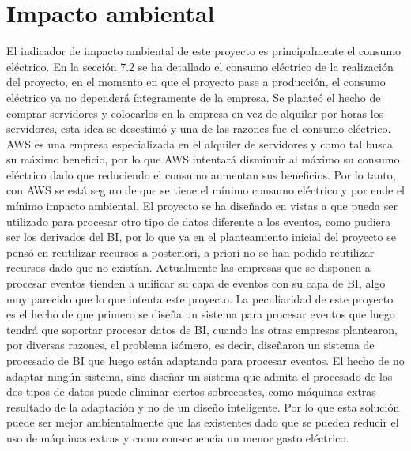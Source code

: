 \section{Impacto ambiental}
El indicador de impacto ambiental de este proyecto es principalmente el consumo eléctrico. En la sección 7.2 se ha detallado el consumo eléctrico de la realización del proyecto, en el momento en que el proyecto pase a producción, el consumo eléctrico ya no dependerá íntegramente de la empresa. Se planteó el hecho de comprar servidores y colocarlos en la empresa en vez de alquilar por horas los servidores, esta idea se desestimó y una de las razones fue el consumo eléctrico. AWS es una empresa especializada en el alquiler de servidores y como tal busca su máximo beneficio, por lo que AWS intentará disminuir al máximo su consumo eléctrico dado que reduciendo el consumo aumentan sus beneficios. Por lo tanto, con AWS se está seguro de que se tiene el mínimo consumo eléctrico y por ende el mínimo impacto ambiental.
El proyecto se ha diseñado en vistas a que pueda ser utilizado para procesar otro tipo de datos diferente a los eventos, como pudiera ser los derivados del BI, por lo que ya en el planteamiento inicial del proyecto se pensó en reutilizar recursos a posteriori, a priori no se han podido reutilizar recursos dado que no existían. 
Actualmente las empresas que se disponen a procesar eventos tienden a unificar su capa de eventos con su capa de BI, algo muy parecido que lo que intenta este proyecto. La peculiaridad de este proyecto es el hecho de que primero se diseña un sistema para procesar eventos que luego tendrá que soportar procesar datos de BI, cuando las otras empresas plantearon, por diversas razones, el problema isómero, es decir, diseñaron un sistema de procesado de BI que luego están adaptando para procesar eventos. El hecho de no adaptar ningún sistema, sino diseñar un sistema que admita el procesado de los dos tipos de datos puede eliminar ciertos sobrecostes, como máquinas extras resultado de la adaptación y no de un diseño inteligente. Por lo que esta solución puede ser mejor ambientalmente que las existentes dado que se pueden reducir el uso de máquinas extras y como consecuencia un menor gasto eléctrico.

